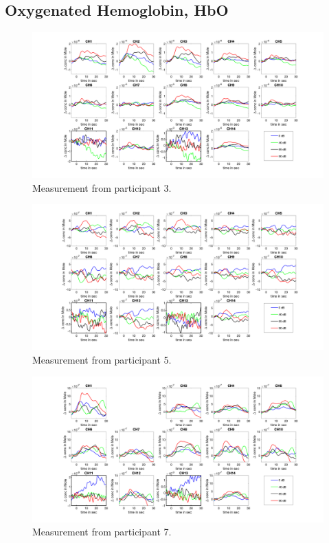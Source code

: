\subsection{Oxygenated Hemoglobin, HbO}
\begin{figure}[H]
  \centering
    \includegraphics[scale=.4]{bilder/HbO_Mole/sub_jonas_s_HbO.png}
  \caption{Measurement from participant 3.}
  \label{fig:somesignal}
\end{figure}

\begin{figure}[H]
  \centering
    \includegraphics[scale=.4]{bilder/HbO_Mole/sub_lukas_s_HbO.png}
  \caption{Measurement from participant 5.}
  \label{fig:somesignal}
\end{figure}

\begin{figure}[H]
  \centering
    \includegraphics[scale=.4]{bilder/HbO_Mole/sub_liao_s_HbO.png}
  \caption{Measurement from participant 7.}
  \label{fig:somesignal}
\end{figure}


